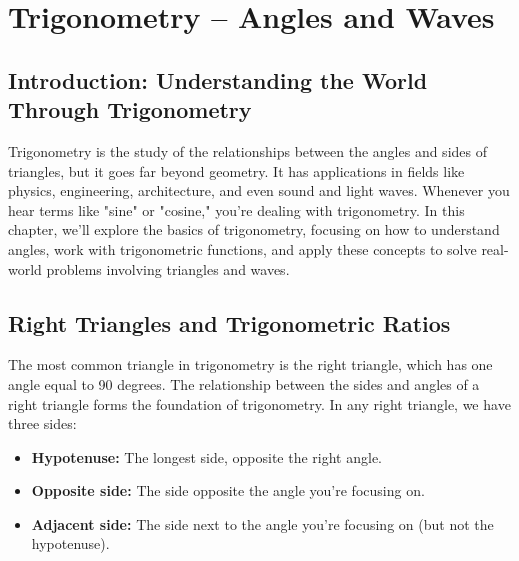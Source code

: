 \chapter{Trigonometry – Angles and Waves}

\section{Introduction: Understanding the World Through Trigonometry}
Trigonometry is the study of the relationships between the angles and sides of triangles, but it goes far beyond geometry. It has applications in fields like physics, engineering, architecture, and even sound and light waves. Whenever you hear terms like "sine" or "cosine," you're dealing with trigonometry.
In this chapter, we’ll explore the basics of trigonometry, focusing on how to understand angles, work with trigonometric functions, and apply these concepts to solve real-world problems involving triangles and waves.

\section{Right Triangles and Trigonometric Ratios}
The most common triangle in trigonometry is the right triangle, which has one angle equal to 90 degrees. The relationship between the sides and angles of a right triangle forms the foundation of trigonometry.
In any right triangle, we have three sides:
\begin{itemize}
    \item \textbf{Hypotenuse:} The longest side, opposite the right angle.
    \item \textbf{Opposite side:} The side opposite the angle you’re focusing on.
    \item \textbf{Adjacent side:} The side next to the angle you’re focusing on (but not the hypotenuse).
\end{itemize}

\begin{center}
\end{center}

